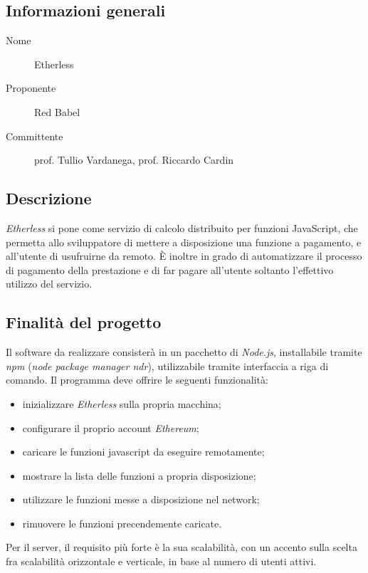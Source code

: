 \documentclass[../studio-di-fattibilita.tex]{subfiles}
\begin{document}
	\subsection{Informazioni generali}
	\label{subsec:informazioni_generali}
	\begin{description}
		\item[Nome] Etherless
		\item[Proponente] Red Babel
		\item[Committente] prof. Tullio Vardanega, prof. Riccardo Cardin
	\end{description}
	\subsection{Descrizione}
	\label{subsec:descrizione}
	\textit{Etherless} si pone come servizio di calcolo distribuito per funzioni JavaScript, che permetta allo sviluppatore di mettere a disposizione una funzione a pagamento, e all'utente di usufruirne da remoto. È inoltre in grado di automatizzare il processo di pagamento della prestazione e di far pagare all'utente soltanto l'effettivo utilizzo del servizio.
	\subsection{Finalità del progetto}
	\label{subsec:finalita_del_progetto}
	Il software da realizzare consisterà in un pacchetto di \textit{Node.js}, installabile tramite \textit{npm} (\textit{node package manager ndr}), utilizzabile tramite interfaccia a riga di comando.
	Il programma deve offrire le seguenti funzionalità:
	\begin{itemize}
		\item inizializzare \textit{Etherless} sulla propria macchina;
		\item configurare il proprio account \textit{Ethereum};
		\item caricare le funzioni javascript da eseguire remotamente;
		\item mostrare la lista delle funzioni a propria disposizione;
		\item utilizzare le funzioni messe a disposizione nel network;
		\item rimuovere le funzioni precendemente caricate.
	\end{itemize}
	Per il server, il requisito più forte è la sua scalabilità, con un accento sulla scelta fra scalabilità orizzontale e verticale, in base al numero di utenti attivi.
\end{document}
